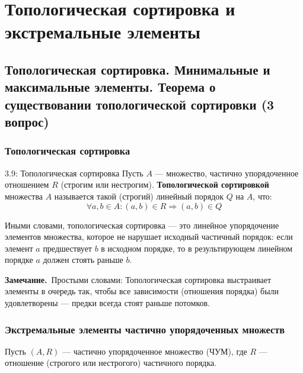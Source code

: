 \documentclass[a4paper,12pt]{article}
\newcommand{\myremark}{\textbf{Замечание.}\ }
\begin{document}
	
	
	
	
	
	
	
	
	
	
	
	\newpage
	\section{Топологическая сортировка и экстремальные элементы}
	
	\subsection{Топологическая сортировка. Минимальные и максимальные элементы. Теорема о существовании топологической сортировки (3 вопрос)}
		
	\subsubsection{Топологическая сортировка}
	
	\begin{definitionbox}{3.9: Топологическая сортировка}
		Пусть $A$ — множество, частично упорядоченное отношением $R$ (строгим или нестрогим). \textbf{Топологической сортировкой} множества $A$ называется такой (строгий) линейный порядок $Q$ на $A$, что:
		\[ \forall a,b \in A: (a,b) \in R \Rightarrow (a,b) \in Q \]
		
		Иными словами, топологическая сортировка — это линейное упорядочение элементов множества, которое не нарушает исходный частичный порядок: если элемент $a$ предшествует $b$ в исходном порядке, то в результирующем линейном порядке $a$ должен стоять раньше $b$.
	\end{definitionbox}
	
	\myremark{Простыми словами:} Топологическая сортировка выстраивает элементы в очередь так, чтобы все зависимости (отношения порядка) были удовлетворены — предки всегда стоят раньше потомков.
	
	
	\subsubsection{Экстремальные элементы частично упорядоченных множеств}
		
	Пусть $(A, R)$ — частично упорядоченное множество (ЧУМ), где $R$ — отношение (строгого или нестрогого) частичного порядка.
	
\end{document}
